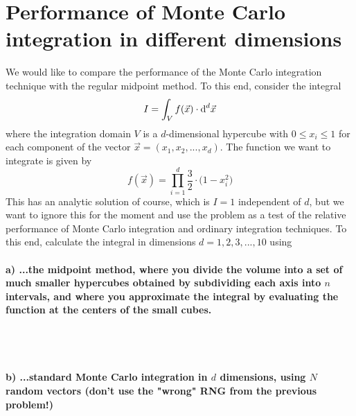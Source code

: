 \documentclass[11 pt]{article}
\begin{document}
    \newpage
    \section{Performance of Monte Carlo integration in different dimensions}
        We would like to compare the performance of the Monte Carlo integration
        technique with the regular midpoint method. To this end, consider the 
        integral
        \begin{equation}
            I=\int_Vf(\vec x)\cdot\textnormal{d}^d\vec x
        \end{equation}
        where the integration domain $V$ is a $d$-dimensional hypercube with 
        $0\leq x_i\leq1$ for each component of the vector 
        $\vec x=(x_1,x_2,..., x_d)$. The function we want to integrate is 
        given by 
        \begin{equation}
            f(\vec x)=\prod_{i=1}^d\frac{3}{2}\cdot\bigg(1-x_i^2\bigg)
        \end{equation}
        This has an analytic solution of course, which is $I=1$ independent of 
        $d$, but we want to ignore this for the moment and use the problem 
        as a test of the relative performance of Monte Carlo integration and 
        ordinary integration techniques. To this end, calculate the integral
        in dimensions $d=1,2,3,...,10$ using 


        \paragraph{a) ...the midpoint method, where you divide the volume 
            into a set of much smaller hypercubes obtained by subdividing each 
            axis into $n$ intervals, and where you approximate the integral by 
            evaluating the function at the centers of the small cubes.
        } \ \\
        \\ 

        \paragraph{b) ...standard Monte Carlo integration in $d$ dimensions, 
            using $N$ random vectors (don't use the "wrong" RNG from the 
            previous problem!)
        } \ \\
\end{document}

